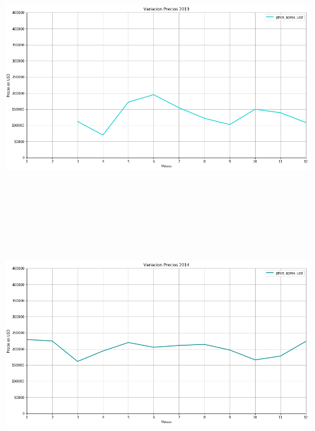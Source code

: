 \documentclass[a4paper, 10pt]{article}
\begin{document}
				\begin{center}
       				\includegraphics[width=6in, height=4.2in]{images/variacion2013}
		   	\end{center}
        \begin{center}
       				\includegraphics[width=6in, height=4.2in]{images/variacion2014}
		   	\end{center}
\end{document}
